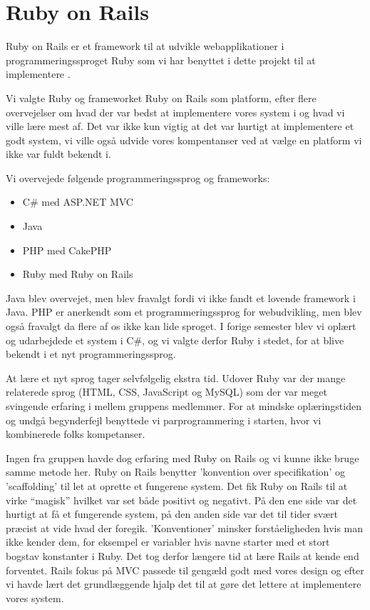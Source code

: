 ﻿\chapter{Ruby on Rails}
\label{akademiskror}

Ruby on Rails er et framework til at udvikle webapplikationer i programmeringssproget Ruby som vi har benyttet i dette projekt til at implementere {\Foodl}.

Vi valgte Ruby og frameworket Ruby on Rails som platform, efter flere overvejelser om hvad der var bedst at implementere vores system i og hvad vi ville lære mest af. Det var ikke kun vigtig at det var hurtigt at implementere et godt system, vi ville også udvide vores kompentanser ved at vælge en platform vi ikke var fuldt bekendt i.

Vi overvejede følgende programmeringssprog og frameworks:
\begin{itemize}
\item C\# med ASP.NET MVC
\item Java
\item PHP med CakePHP
\item Ruby med Ruby on Rails
\end{itemize}

Java blev overvejet, men blev fravalgt fordi vi ikke fandt et lovende framework i Java. PHP er anerkendt som et programmeringssprog for webudvikling, men blev også fravalgt da flere af os ikke kan lide sproget. I forige semester blev vi oplært og udarbejdede et system i C\#, og vi valgte derfor Ruby i stedet, for at blive bekendt i et nyt programmeringssprog.

At lære et nyt sprog tager selvfølgelig ekstra tid. Udover Ruby var der mange relaterede sprog (HTML, CSS, JavaScript og MySQL) som der var meget svingende erfaring i mellem gruppens medlemmer. For at mindske oplæringstiden og undgå begynderfejl benyttede vi parprogrammering i starten, hvor vi kombinerede folks kompetanser.

Ingen fra gruppen havde dog erfaring med Ruby on Rails og vi kunne ikke bruge samme metode her. Ruby on Rails benytter 'konvention over specifikation' og 'scaffolding' til let at oprette et fungerene system. Det fik Ruby on Rails til at virke ``magisk'' hvilket var set både positivt og negativt. På den ene side var det hurtigt at få et fungerende system, på den anden side var det til tider svært præcist at vide hvad der foregik. 'Konventioner' minsker forståeligheden hvis man ikke kender dem, for eksempel er variabler hvis navne starter med et stort bogstav konstanter i Ruby. Det tog derfor længere tid at lære Rails at kende end forventet. 
Rails fokus på MVC passede til gengæld godt med vores design og efter vi havde lært det grundlæggende hjalp det til at gøre det lettere at implementere vores system.

